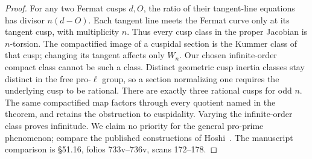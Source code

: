 \begin{proof}
For any two Fermat cusps $d,O$, the ratio of
their tangent-line equations has divisor
$n(d-O)$. Each tangent line meets the Fermat
curve only at its tangent cusp, with
multiplicity $n$. Thus every cusp class in
the proper Jacobian is $n$-torsion.
The compactified image of a cuspidal section
is the Kummer class of that cusp; changing its
tangent affects only $W_n$. Our chosen
infinite-order compact class cannot be such
a class. Distinct geometric cusp inertia
classes stay distinct in the free pro-$\ell$
group, so a section normalizing one requires
the underlying cusp to be rational. There
are exactly three rational cusps for odd $n$.
The same compactified map factors through
every quotient named in the theorem, and
retains the obstruction to cuspidality.
Varying the infinite-order class proves
infinitude. We claim no priority for the
general pro-prime phenomenon; compare the
published constructions of Hoshi~\cite{Hoshi2010}.
The manuscript comparison is \S51.16,
folios 733v--736v, scans 172--178.
\end{proof}

